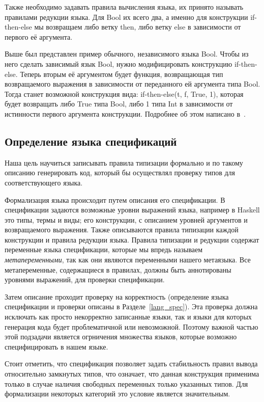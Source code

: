 Также необходимо задавать правила вычисления языка, их принято называть правилами редукции языка. Для Bool их всего два, а именно для конструкции if-then-else мы возвращаем либо ветку then, либо ветку else в зависимости от первого её аргумента.

Выше был представлен пример обычного, независимого языка Bool. Чтобы из него сделать зависимый язык Bool, нужно модифицировать конструкцию if-then-else. Теперь вторым её аргументом будет функция, возвращающая тип возвращаемого выражения в зависимости от переданного ей аргумента типа Bool. Тогда станет возможной конструкция вида: if-then-else(t, f, True, 1), которая будет возвращать либо True типа Bool, либо 1 типа Int в зависимости от истинности первого аргумента конструкции. Подробнее об этом написано в~\cite{martin_lof}.

\subsection*{Определение языка спецификаций}

Наша цель научиться записывать правила типизации формально и по такому описанию генерировать код, который бы осуществлял проверку типов для соответствующего языка.

Формализация языка происходит путем описания его спецификации. В спецификации задаются возможные уровни выражений языка, например в Haskell это типы, термы и виды; его конструкции, с описанием уровней аргументов и возвращаемого выражения. Также описываются правила типизации каждой конструкции и правила редукции языка. Правила типизации и редукции содержат переменные языка спецификации, которые мы впредь называем \textit{метапеременными}, так как они являются переменными нашего метаязыка. Все метапеременные, содержащиеся в правилах, должны быть аннотированы уровнями выражений, для проверки спецификации.

Затем описание проходит проверку на корректность (определение языка спецификации и проверки описаны в Разделе~\ref{lang_spec}). Эта проверка должна исключать как просто некорректно записанные языки, так и языки для которых генерация кода будет проблематичной или невозможной. Поэтому важной частью этой подзадачи является огрничения множества языков, которые возможно специфицировать в нашем языке.

Стоит отметить, что спецификация позволяет задать стабильность правил вывода относительно замкнутых типов, что означает, что данная конструкция применима только в случае наличия свободных переменных только указанных типов. Для формализации некоторых категорий\cite{ncat:inf} это условие является значительным.

